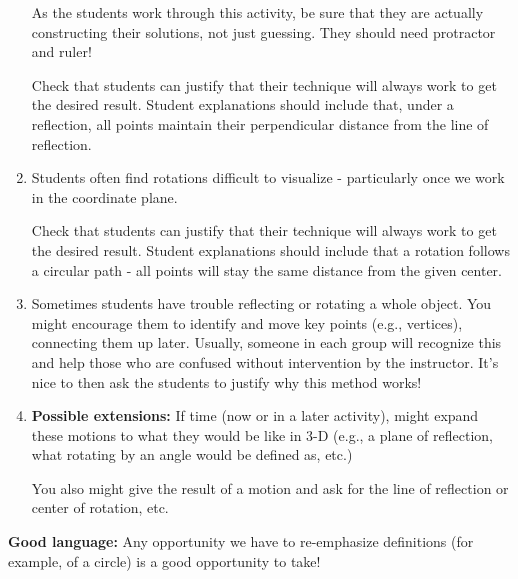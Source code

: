 \documentclass[nooutcomes,noauthor, handout]{ximera}
\begin{document}
\begin{instructorNotes}
\begin{enumerate}
As the students work through this activity, be sure that they are actually constructing their solutions, not just guessing.  They should need protractor and ruler!

Check that students can justify that their technique will always work to get the desired result.   Student explanations should include that, under a reflection, all points maintain their perpendicular distance from the line of reflection.

\item Students often find rotations difficult to visualize - particularly once we work in the coordinate plane.

Check that students can justify that their technique will always work to get the desired result.   Student explanations should include that a rotation follows a circular path - all points will stay the same distance from the given center.

\item Sometimes students have trouble reflecting or rotating a whole object.  You might encourage them to identify and move key points (e.g., vertices), connecting them up later.  Usually, someone in each group will recognize this and help those who are confused without intervention by the instructor.  It's nice to then ask the students to justify why this method works!

\item {\bf Possible extensions:} If time (now or in a later activity), might expand these motions to what they would be like in 3-D (e.g., a plane of reflection, what rotating by an angle would be defined as, etc.)

You also might give the result of a motion and ask for the line of reflection or center of rotation, etc.


\end{enumerate}

{\bf Good language:} Any opportunity we have to re-emphasize definitions (for example, of a circle) is a good opportunity to take!




\end{instructorNotes}
\end{document}
